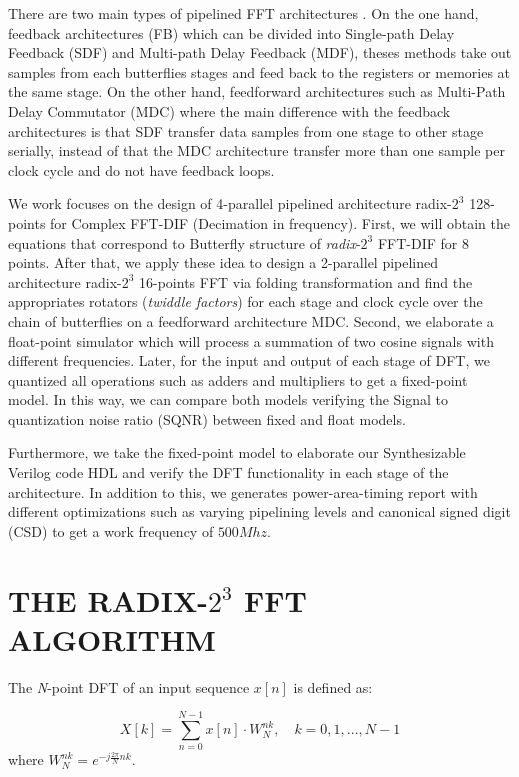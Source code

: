 \documentclass[journal,comsoc]{IEEEtran}
\begin{document}
There are two main types of pipelined FFT architectures \cite{shousheng_he_designing_1998}. On the one hand, feedback architectures (FB) which can be divided into Single-path Delay Feedback (SDF) and Multi-path Delay Feedback (MDF), theses methods take out samples from each butterflies stages and feed back to the registers or memories at the same stage. On the other hand, feedforward architectures such as Multi-Path Delay Commutator (MDC) where the main difference with the feedback architectures is that SDF transfer data samples from one stage to other stage serially, instead of that the MDC architecture transfer more than one sample per clock cycle and do not have feedback loops.

We work focuses on the design of 4-parallel pipelined architecture radix-$2^3$ 128-points for Complex FFT-DIF (Decimation in frequency). First, we will obtain the equations that correspond to Butterfly structure of \textit{radix}-$2^3$ FFT-DIF for 8 points. After that, we apply these idea to design a 2-parallel pipelined architecture radix-$2^3$ 16-points FFT via folding transformation and find the appropriates rotators (\textit{twiddle factors}) for each stage and clock cycle over the chain of butterflies on a feedforward architecture MDC. Second, we elaborate a float-point simulator which will process a summation of two cosine signals with different frequencies. Later, for the input and output of each stage of DFT, we quantized all operations such as adders and multipliers to get a fixed-point model. In this way, we can compare both models verifying the Signal to quantization noise ratio (SQNR) between fixed and float models.

Furthermore, we take the fixed-point model to elaborate our Synthesizable Verilog code HDL and verify the DFT functionality in each stage of the architecture. In addition to this, we generates power-area-timing report with different optimizations such as varying pipelining levels and canonical signed digit (CSD) to get a work frequency of $500Mhz$.



\section{THE RADIX-$2^3$ FFT ALGORITHM}
The \textit{N}-point DFT of an input sequence $x[n]$ is defined as:

\begin{equation}
	X[k] = \sum_{n=0}^{N-1} x[n] \cdot W_N^{nk}, \quad k=0,1,...,N-1
\end{equation}
where $W_N^{nk} = e^{-j\frac{2\pi}{N} nk}$. 
\end{document}
